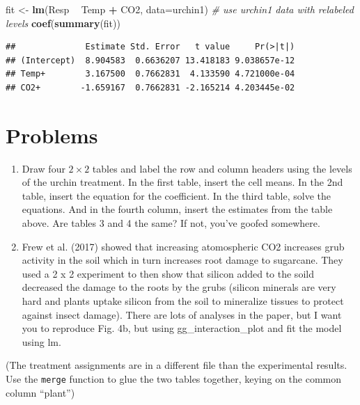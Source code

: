 \documentclass[]{book}
\newenvironment{Shaded}{\begin{snugshade}}{\end{snugshade}}
\newcommand{\KeywordTok}[1]{\textcolor[rgb]{0.13,0.29,0.53}{\textbf{#1}}}
\newcommand{\DataTypeTok}[1]{\textcolor[rgb]{0.13,0.29,0.53}{#1}}
\newcommand{\StringTok}[1]{\textcolor[rgb]{0.31,0.60,0.02}{#1}}
\newcommand{\CommentTok}[1]{\textcolor[rgb]{0.56,0.35,0.01}{\textit{#1}}}
\newcommand{\OperatorTok}[1]{\textcolor[rgb]{0.81,0.36,0.00}{\textbf{#1}}}
\newcommand{\NormalTok}[1]{#1}
\theoremstyle{definition}
\theoremstyle{definition}
\theoremstyle{definition}
\theoremstyle{remark}
\begin{document}
\begin{Shaded}
\begin{Highlighting}[]
\NormalTok{fit <-}\StringTok{ }\KeywordTok{lm}\NormalTok{(Resp }\OperatorTok{~}\StringTok{ }\NormalTok{Temp }\OperatorTok{+}\StringTok{ }\NormalTok{CO2, }\DataTypeTok{data=}\NormalTok{urchin1) }\CommentTok{# use urchin1 data with relabeled levels}
\KeywordTok{coef}\NormalTok{(}\KeywordTok{summary}\NormalTok{(fit))}
\end{Highlighting}
\end{Shaded}

\begin{verbatim}
##              Estimate Std. Error   t value     Pr(>|t|)
## (Intercept)  8.904583  0.6636207 13.418183 9.038657e-12
## Temp+        3.167500  0.7662831  4.133590 4.721000e-04
## CO2+        -1.659167  0.7662831 -2.165214 4.203445e-02
\end{verbatim}

\section{Problems}\label{problems-3}

\begin{enumerate}
\def\labelenumi{\arabic{enumi}.}
\item
  Draw four \(2 \times 2\) tables and label the row and column headers
  using the levels of the urchin treatment. In the first table, insert
  the cell means. In the 2nd table, insert the equation for the
  coefficient. In the third table, solve the equations. And in the
  fourth column, insert the estimates from the table above. Are tables 3
  and 4 the same? If not, you've goofed somewhere.
\item
  Frew et al. (2017) showed that increasing atomospheric CO2 increases
  grub activity in the soil which in turn increases root damage to
  sugarcane. They used a 2 x 2 experiment to then show that silicon
  added to the soild decreased the damage to the roots by the grubs
  (silicon minerals are very hard and plants uptake silicon from the
  soil to mineralize tissues to protect against insect damage). There
  are lots of analyses in the paper, but I want you to reproduce Fig.
  4b, but using gg\_interaction\_plot and fit the model using lm.
\end{enumerate}

(The treatment assignments are in a different file than the experimental
results. Use the \texttt{merge} function to glue the two tables
together, keying on the common column ``plant'')
\end{document}
